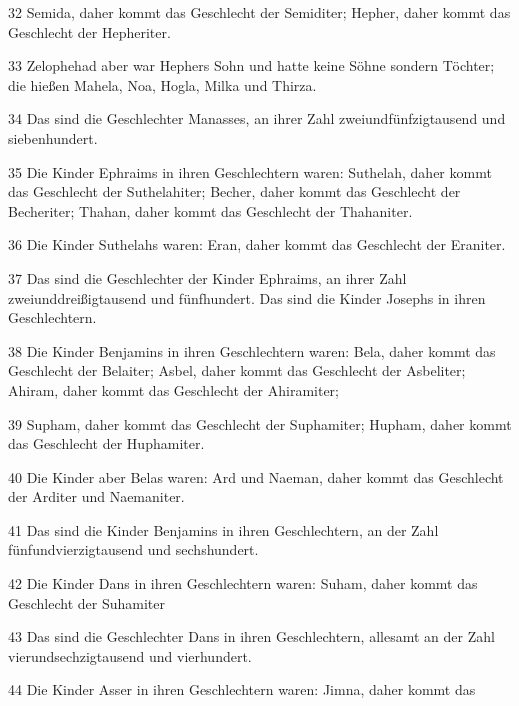 \par 32 Semida, daher kommt das Geschlecht der Semiditer; Hepher, daher kommt das Geschlecht der Hepheriter.
\par 33 Zelophehad aber war Hephers Sohn und hatte keine Söhne sondern Töchter; die hießen Mahela, Noa, Hogla, Milka und Thirza.
\par 34 Das sind die Geschlechter Manasses, an ihrer Zahl zweiundfünfzigtausend und siebenhundert.
\par 35 Die Kinder Ephraims in ihren Geschlechtern waren: Suthelah, daher kommt das Geschlecht der Suthelahiter; Becher, daher kommt das Geschlecht der Becheriter; Thahan, daher kommt das Geschlecht der Thahaniter.
\par 36 Die Kinder Suthelahs waren: Eran, daher kommt das Geschlecht der Eraniter.
\par 37 Das sind die Geschlechter der Kinder Ephraims, an ihrer Zahl zweiunddreißigtausend und fünfhundert. Das sind die Kinder Josephs in ihren Geschlechtern.
\par 38 Die Kinder Benjamins in ihren Geschlechtern waren: Bela, daher kommt das Geschlecht der Belaiter; Asbel, daher kommt das Geschlecht der Asbeliter; Ahiram, daher kommt das Geschlecht der Ahiramiter;
\par 39 Supham, daher kommt das Geschlecht der Suphamiter; Hupham, daher kommt das Geschlecht der Huphamiter.
\par 40 Die Kinder aber Belas waren: Ard und Naeman, daher kommt das Geschlecht der Arditer und Naemaniter.
\par 41 Das sind die Kinder Benjamins in ihren Geschlechtern, an der Zahl fünfundvierzigtausend und sechshundert.
\par 42 Die Kinder Dans in ihren Geschlechtern waren: Suham, daher kommt das Geschlecht der Suhamiter
\par 43 Das sind die Geschlechter Dans in ihren Geschlechtern, allesamt an der Zahl vierundsechzigtausend und vierhundert.
\par 44 Die Kinder Asser in ihren Geschlechtern waren: Jimna, daher kommt das Geschlecht der Jimniter; Jiswi, daher kommt das Geschlecht der Jiswiter; Beria, daher kommt das Geschlecht der Beriiter.
\par 45 Aber die Kinder Berias waren: Heber, daher kommt das Geschlecht der Hebriter; Melchiel, daher kommt das Geschlecht der Melchieliter.
\par 46 Und die Tochter Assers hieß Sarah.
\par 47 Das sind die Geschlechter der Kinder Assers, an ihrer Zahl dreiundfünfzigtausend und vierhundert.
